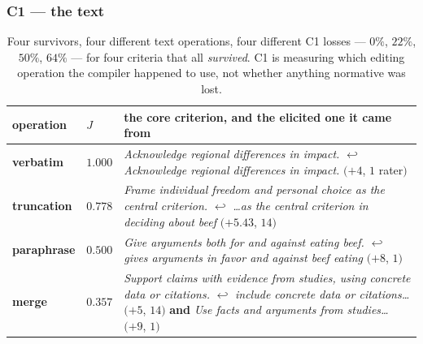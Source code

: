 \subsubsection{C1 --- the text}
\label{sec:c1def}




\begin{table}[H]\centering\footnotesize
\begin{tabularx}{\textwidth}{P{1.9cm}P{0.7cm}Y}
\toprule
operation & $J$ & the core criterion, and the elicited one it came from\\
\midrule
\textbf{verbatim} & $1.000$ & \emph{Acknowledge regional differences in impact.}\newline
$\hookleftarrow$ \emph{Acknowledge regional differences in impact.} $(+4$, $1$ rater$)$\\
\textbf{truncation} & $0.778$ & \emph{Frame individual freedom and personal choice as the central criterion.}\newline
$\hookleftarrow$ \emph{\dots as the central criterion in deciding about beef} $(+5.43$, $14)$\\
\textbf{paraphrase} & $0.500$ & \emph{Give arguments both for and against eating beef.}\newline
$\hookleftarrow$ \emph{gives arguments in favor and against beef eating} $(+8$, $1)$\\
\textbf{merge} & $0.357$ & \emph{Support claims with evidence from studies, using concrete data or citations.}\newline
$\hookleftarrow$ \emph{include concrete data or citations\dots} $(+5$, $14)$
\textbf{and} \emph{Use facts and arguments from studies\dots} $(+9$, $1)$\\
\bottomrule
\end{tabularx}
\caption{Four survivors, four different text operations, four different C1
losses --- $0\%$, $22\%$, $50\%$, $64\%$ --- for four criteria that all
\emph{survived}. C1 is measuring which editing operation the compiler happened to
use, not whether anything normative was lost.}
\label{tab:c1ops}
\end{table}

